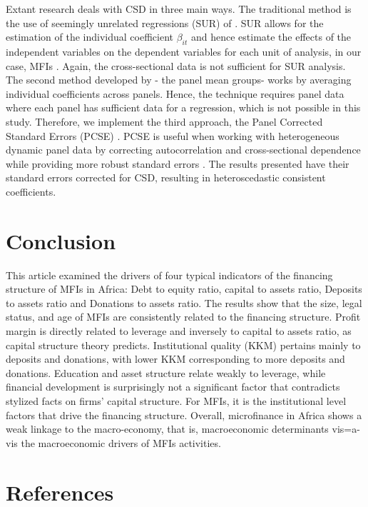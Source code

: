 \documentclass[a4paper,nobind]{templates/ociamthesis}
\begin{document}
Extant research deals with CSD in three main ways. The traditional method is the use of seemingly unrelated regressions (SUR) of \textcite{zellner1962further,arouri2013econometric}. SUR allows for the estimation of the individual coefficient \(\beta_{it}\) and hence estimate the effects of the independent variables on the dependent variables for each unit of analysis, in our case, MFIs \autocite{sarafidis2012cross}. Again, the cross-sectional data is not sufficient for SUR analysis. The second method developed by \textcite{esaran2021general} - the panel mean groups- works by averaging individual coefficients across panels. Hence, the technique requires panel data where each panel has sufficient data for a regression, which is not possible in this study. Therefore, we implement the third approach, the Panel Corrected Standard Errors (PCSE) \autocite{bailey2011implementing,croissant2008panel}. PCSE is useful when working with heterogeneous dynamic panel data by correcting autocorrelation and cross-sectional dependence while providing more robust standard errors \autocite{ikpesu2019growth}. The results presented have their standard errors corrected for CSD, resulting in heteroscedastic consistent coefficients.

\hypertarget{conclusion}{%
\section{Conclusion}\label{conclusion}}

This article examined the drivers of four typical indicators of the financing structure of MFIs in Africa: Debt to equity ratio, capital to assets ratio, Deposits to assets ratio and Donations to assets ratio. The results show that the size, legal status, and age of MFIs are consistently related to the financing structure. Profit margin is directly related to leverage and inversely to capital to assets ratio, as capital structure theory predicts. Institutional quality (KKM) pertains mainly to deposits and donations, with lower KKM corresponding to more deposits and donations. Education and asset structure relate weakly to leverage, while financial development is surprisingly not a significant factor that contradicts stylized facts on firms' capital structure. For MFIs, it is the institutional level factors that drive the financing structure. Overall, microfinance in Africa shows a weak linkage to the macro-economy, that is, macroeconomic determinants vis=a-vis the macroeconomic drivers of MFIs activities.

\hypertarget{references}{%
\section{\texorpdfstring{\textbf{References}}{References}}\label{references}}
\end{document}
